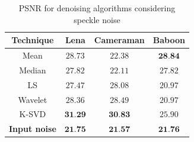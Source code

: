 \begin{table}[H]
	\centering
	\caption{PSNR for denoising algorithms considering speckle noise}
	\begin{tabular}{|c|c|c|c|}
	\hline
	\textbf{Technique} & \textbf{Lena} & \textbf{Cameraman} & \textbf{Baboon} \\ \hline
	Mean & $28.73$ & $22.38$ & $\textbf{28.84}$ \\ \hline
	Median & $27.82$ & $22.11$ & $27.82$ \\ \hline
	LS & $27.47$ & $28.08$ & $20.97$ \\ \hline
	Wavelet & $28.36$ & $28.49$ & $20.97 $\\ \hline
	K-SVD & $\textbf{31.29}$ & $\textbf{30.83}$ & $25.90$ \\ \hline
	\textbf{Input noise} & $\textbf{21.75}$ & $\textbf{21.57}$ & $\textbf{21.76}$ \\ \hline
	\end{tabular}
	\label{tab:numerical_results_speckle}
\end{table}